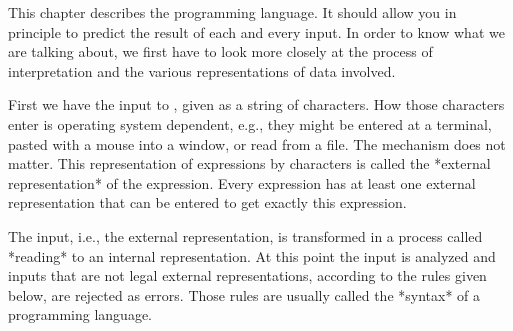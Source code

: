 
This chapter describes the {\GAP} programming language.   It should allow
you in principle to predict the result of each and every input.  In order
to know what we are talking about, we first have to  look more closely at
the process of  interpretation  and the  various representations  of data
involved.

First we have the input to {\GAP}, given as a string  of characters.  How
those characters enter {\GAP} is operating system  dependent,  e.g., they
might be entered at a  terminal, pasted with  a mouse into  a window,  or
read from a file.  The mechanism does not matter.  This representation of
expressions by characters is called the *external representation* of  the
expression.  Every expression has  at  least one external  representation
that can be entered to get exactly this expression.

The input, i.e., the external representation, is transformed in a process
called *reading* to an internal representation.   At this point the input
is analyzed  and inputs   that  are  not legal external  representations,
according to the rules given below, are rejected  as errors.  Those rules
are usually called the *syntax* of a programming language.

